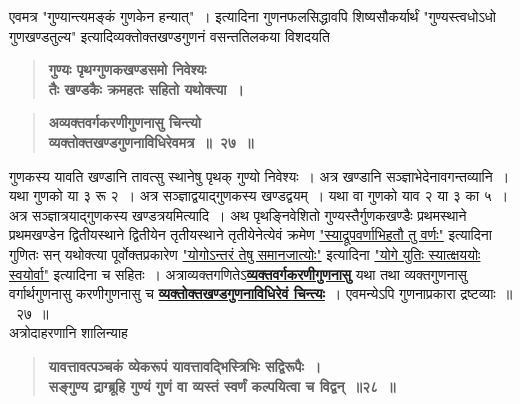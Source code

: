 \documentclass[11pt, openany]{book}
\begin{document}
\begin{sloppypar}
{\small एवमत्र {\color{violet}"गुण्यान्त्यमङ्कं गुणकेन हन्यात्"~।} इत्यादिना गुणनफलसिद्धावपि शिष्यसौकर्यार्थं {\color{violet}"गुण्यस्त्वधोऽधो गुणखण्डतुल्य"} इत्यादिव्यक्तोक्तखण्डगुणनं वसन्ततिलकया विशदयति\textendash }

 \label{3.27.1}
\begin{quote}
{\large \textbf{{\color{purple}गुण्यः पृथग्गुणकखण्डसमो निवेश्यः \\
तैः खण्डकैः क्रमहतः सहितो यथोक्त्या~।}}}
\end{quote}
\end{sloppypar}

\newpage

\begin{sloppypar}
 \label{3.27}
\begin{quote}
{\large \textbf{{\color{purple}अव्यक्तवर्गकरणीगुणनासु चिन्त्यो \\
व्यक्तोक्तखण्डगुणनाविधिरेवमत्र~॥~२७~॥}}}
\end{quote}

गुणकस्य यावति खण्डानि तावत्सु स्थानेषु पृथक् गुण्यो निवेश्यः~। अत्र खण्डानि सञ्ज्ञाभेदेनावगन्तव्यानि~। यथा गुणको या ३ रू २~। अत्र सञ्ज्ञाद्वयाद्गुणकस्य खण्डद्वयम्~। यथा वा गुणको याव २ या ३ का ५~। अत्र सञ्ज्ञात्रयाद्गुणकस्य खण्डत्रयमित्यादि~। अथ पृथङ्निवेशितो गुण्यस्तैर्गुणकखण्डैः प्रथमस्थाने प्रथमखण्डेन द्वितीयस्थाने द्वितीयेन तृतीयस्थाने तृतीयेनेत्येवं क्रमेण \hyperref[3.26]{"स्याद्रूपवर्णाभिहतौ तु वर्णः"} इत्यादिना गुणितः सन् यथोक्त्या पूर्वोक्तप्रकारेण \hyperref[3.22]{"योगोऽन्तरं तेषु समानजात्योः"} इत्यादिना \hyperref[1.3]{"योगे युतिः स्यात्क्षययोः स्वयोर्वा"} इत्यादिना च सहितः~। अत्राव्यक्तगणितेऽ\hyperref[3.27]{\textbf{व्यक्तवर्गकरणीगुणनासु}} यथा तथा व्यक्तगुणनासु वर्गार्थगुणनासु करणीगुणनासु च \hyperref[3.27]{\textbf{व्यक्तोक्तखण्डगुणनाविधिरेवं चिन्त्यः}}~। एवमन्येऽपि गुणनाप्रकारा द्रष्टव्याः~॥~२७~॥\\

{\small अत्रोदाहरणानि शालिन्याह\textendash }

 \label{3.28}
\begin{quote}
{\large \textbf{{\color{purple}यावत्तावत्पञ्चकं व्येकरूपं यावत्तावद्भिस्त्रिभिः सद्विरूपैः~। \\
सङ्गुण्य द्राग्ब्रूहि गुण्यं गुणं वा व्यस्तं स्वर्णं कल्पयित्वा च विद्वन्~॥२८~॥}}}
\end{quote}


\end{sloppypar}
\end{document}
